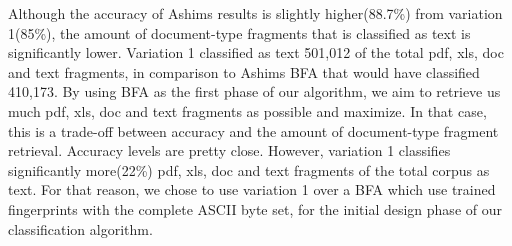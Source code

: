  Although the accuracy of Ashims results is slightly higher(88.7\%) from variation 1(85\%), the amount of document-type fragments that is classified as text is significantly lower. Variation 1 classified as text 501,012 of the total pdf, xls, doc and text fragments, in comparison to Ashims BFA that would have classified 410,173. By using BFA as the first phase of our algorithm, we aim to retrieve us much pdf, xls, doc and text fragments as possible and maximize. In that case, this is a trade-off between accuracy and the amount of document-type fragment retrieval. Accuracy levels are pretty close. However, variation 1 classifies significantly more(22\%) pdf, xls, doc and text fragments of the total corpus as text. For that reason, we chose to use variation 1 over a BFA which use trained fingerprints with the complete ASCII byte set, for the initial design phase of our classification algorithm.
 
 

